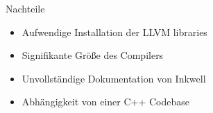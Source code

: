 \begin{frame}{Nachteile}
    \begin{itemize}
        \item<1-> Aufwendige Installation der LLVM libraries
        \item<2-> Signifikante Größe des Compilers
        \item<3-> Unvollständige Dokumentation von Inkwell
        \item<4-> Abhängigkeit von einer C++ Codebase
    \end{itemize}
\end{frame}
